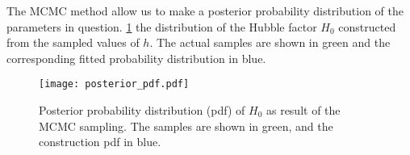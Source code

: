     The MCMC method allow us to make a posterior probability distribution of the parameters in question. \cref{fig:m1:posterior_pdf} the distribution of the Hubble factor $H_0$ constructed from the sampled values of $h$. The actual samples are shown in green and the corresponding fitted probability distribution in blue. 

    \begin{figure}
        \texttt{[image: posterior\_pdf.pdf]}
        \caption{Posterior probability distribution (pdf) of $H_0$ as result of the MCMC sampling. The samples are shown in green, and the construction pdf in blue. }
        \label{fig:m1:posterior_pdf}
    \end{figure}

